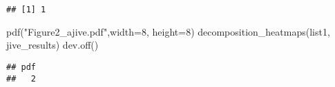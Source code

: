 \documentclass[
]{article}
\newenvironment{Shaded}{\begin{snugshade}}{\end{snugshade}}
\newcommand{\AttributeTok}[1]{\textcolor[rgb]{0.77,0.63,0.00}{#1}}
\newcommand{\DecValTok}[1]{\textcolor[rgb]{0.00,0.00,0.81}{#1}}
\newcommand{\FunctionTok}[1]{\textcolor[rgb]{0.00,0.00,0.00}{#1}}
\newcommand{\NormalTok}[1]{#1}
\newcommand{\StringTok}[1]{\textcolor[rgb]{0.31,0.60,0.02}{#1}}
\begin{document}
\begin{verbatim}
## [1] 1
\end{verbatim}

\begin{Shaded}
\begin{Highlighting}[]
\FunctionTok{pdf}\NormalTok{(}\StringTok{"Figure2\_ajive.pdf"}\NormalTok{,}\AttributeTok{width=}\DecValTok{8}\NormalTok{, }\AttributeTok{height=}\DecValTok{8}\NormalTok{)}
\FunctionTok{decomposition\_heatmaps}\NormalTok{(list1, jive\_results)}
\FunctionTok{dev.off}\NormalTok{()}
\end{Highlighting}
\end{Shaded}

\begin{verbatim}
## pdf 
##   2
\end{verbatim}
\end{document}
